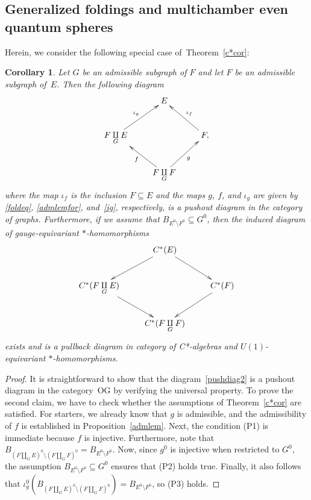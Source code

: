 \documentclass[12pt,times,a4paper]{amsart}
\newtheorem{corollary}[theorem]{Corollary}
\numberwithin{equation}{section}
\numberwithin{equation}{section}
\begin{document}
\subsection{Generalized foldings and multichamber even quantum spheres}
Herein, we consider the following special case of~Theorem~\ref{c*cor}:
\begin{corollary}\label{cor6.4}
Let $G$ be an admissible subgraph of $F$ and let $F$ be an admissible subgraph of~$E$. Then the following diagram 
\begin{equation}\label{pushdiag2}
\xymatrix{
&
E
&\\
F\underset{G}{\amalg}E
\ar^{\iota_g}[ur]& & 
F,
\ar_{\iota_f}[ul]\\
&
F\underset{G}{\amalg}F \ar^f[ul] \ar_{g}[ur]&
}
\end{equation}
where the map $\iota_f$ is the inclusion $F\subseteq E$ and the maps $g$, $f$, and $\iota_g$ are given by \eqref{foldeq}, \eqref{admlemfor}, and~\eqref{ig}, 
respectively, is a pushout diagram in the category of graphs. Furthermore, if we assume that $B_{E^0\setminus F^0}\subseteq G^0$, then the induced 
diagram of gauge-equivariant $*$-homomorphisms
\begin{equation}\label{c*pull2}
\xymatrix{
&
C^*(E)
\ar[dl] \ar[dr]&\\
C^*(F\underset{G}{\amalg}E)
\ar[dr] & & 
C^*(F)
\ar[dl]\\
& C^*(F\underset{G}{\amalg}F) &
}
\end{equation}
exists and is a pullback diagram in category of C*-algebras and $U(1)$-equivariant $*$-ho\-mo\-mor\-phisms.
\end{corollary}
\begin{proof}
It is straightforward to show that the diagram~\eqref{pushdiag2} is a pushout diagram in the category~{\rm OG} by verifying the universal property. To 
prove the second claim, we have to check whether the assumptions of Theorem~\ref{c*cor} are satisfied. For starters, we already know that $g$ is 
admissible, and the admissibility of $f$ is established in Proposition~\ref{admlem}. Next, the condition (P1) is immediate because $f$ is injective. Furthermore, 
note that $B_{(F\amalg_G E)^0\setminus (F\amalg_G F)^0}=B_{E^0\setminus F^0}$. Now, since $g^0$ is injective when restricted to $G^0$, the 
assumption $B_{E^0\setminus F^0}\subseteq G^0$ ensures that (P2) holds true. Finally, it also follows that $\iota_g^0(B_{(F\coprod_GE)^0\setminus(F\coprod_GF)^0})=B_{E^0\setminus F^0}$,
so (P3) holds.
\end{proof}
\end{document}
